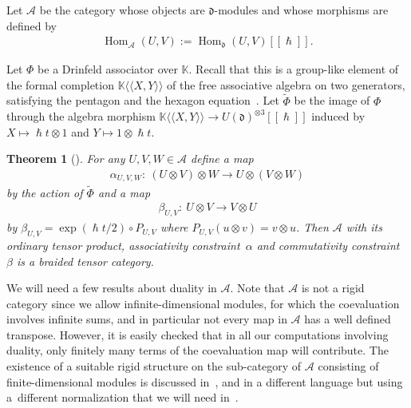 \documentclass[pdftex]{sigma}
\numberwithin{equation}{section}
\newcommand{\mf}[1]{\mathfrak{#1}}
\newcommand{\h}{\hslash}
\newcommand{\ot}{\otimes}
\newcommand{\cA}{\mathcal {A}}
\newcommand{\kk}{\mathbb K}
\renewcommand{\hom}{\operatorname{Hom}}
\newtheorem{thm}{Theorem}[section]
\theoremstyle{definition}
\begin{document}
Let $\cA$ be the category whose objects are $\mf d$-modules and whose morphisms are def\/ined by
\begin{gather*}
	\hom_\cA(U,V):=\hom_{\mf d}(U,V)[[\h]].
\end{gather*}

Let $\Phi$ be a Drinfeld associator over $\kk$. Recall that this is a group-like element of the formal completion $\kk\langle\langle X,Y\rangle\rangle$ of the free associative algebra on two generators, satisfying the pentagon and the hexagon equation~\cite{Drinfeld1990a}. Let $\tilde\Phi$ be the image of $\Phi$ through the algebra morphism $\kk\langle\langle X,Y\rangle\rangle \rightarrow U(\mf d)^{\ot 3}[[\h]]$ induced by $X\mapsto \h t\ot 1$ and $Y\mapsto 1\ot \h t$.
	\begin{thm}[\cite{Drinfeld1990,Drinfeld1990a}]
For any $U,V,W \in \cA$ define a map
\begin{gather*}
	\alpha_{U,V,W}\colon \ (U\ot V)\ot W \rightarrow U\ot (V \ot W)
\end{gather*}
by the action of $\tilde \Phi$ and a map
\begin{gather*}
	\beta_{U,V}\colon \ U\ot V \rightarrow V \ot U
\end{gather*}
by $\beta_{U,V}=\exp(\h t/2)\circ P_{U,V}$ where $P_{U,V}(u\ot v)=v\ot u$. Then $\cA$ with its ordinary tensor product, associativity constraint~$\alpha$ and commutativity constraint $\beta$ is a braided tensor category.
\end{thm}

We will need a few results about duality in $\cA$. Note that $\cA$ is not a rigid category since we allow inf\/inite-dimensional modules, for which the coevaluation involves inf\/inite sums, and in particular not every map in $\cA$ has a well def\/ined transpose. However, it is easily checked that in all our computations involving duality, only f\/initely many terms of the coevaluation map will contribute. The existence of a suitable rigid structure on the sub-category of $\cA$ consisting of f\/inite-dimensional modules is discussed in~\cite{Cartier1993,Drinfeld1990,Kassel1998}, and in a dif\/ferent language but using a~dif\/ferent normalization that we will need in~\cite{Le1995,Le1997}.
\end{document}

